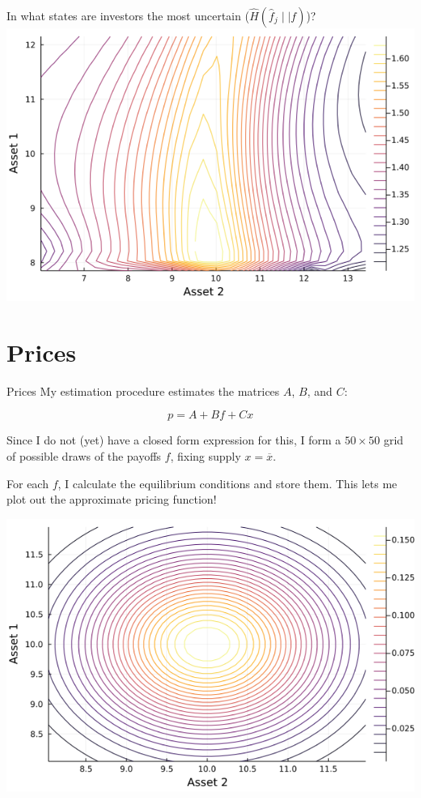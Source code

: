 \documentclass[
  ignorenonframetext,
]{beamer}
\begin{document}
\begin{frame}{In what states are investors the most uncertain
(\(\hat H(\hat f_j \mid\mid f)\))?}
\includegraphics[width=0.4\paperheight]{complexity_files/figure-beamer/unnamed-chunk-21-4}
\end{frame}

\hypertarget{prices-2}{%
\section{Prices}\label{prices-2}}

\begin{frame}{Prices}
\protect\hypertarget{prices-3}{}
My estimation procedure estimates the matrices \(A\), \(B\), and \(C\):

\[
p = A + B f + C x
\]

Since I do not (yet) have a closed form expression for this, I form a
\(50 \times 50\) grid of possible draws of the payoffs \(f\), fixing
supply \(x = \overline x\).

For each \(f\), I calculate the equilibrium conditions and store them.
This lets me plot out the approximate pricing function!
\end{frame}

\begin{frame}{}
\protect\hypertarget{section}{}
\begin{center}\includegraphics[width=0.95\paperheight]{complexity_files/figure-beamer/unnamed-chunk-22-1} \end{center}
\end{frame}
\end{document}
